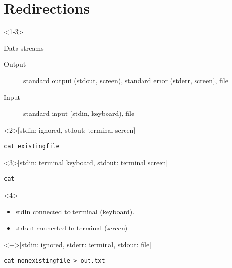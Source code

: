 \section{Redirections}

\begin{frame}[fragile]
  \begin{onlyenv}<1-3>
    \begin{block}{Data streams}
      \begin{description}
        \item[Output]
          standard output (stdout, screen),
          standard error (stderr, screen),
          file
        \item[Input]
          standard input (stdin, keyboard),
          file
      \end{description}
    \end{block}
  \end{onlyenv}

  \begin{example}<2>[stdin: ignored, stdout: terminal screen]
    \begin{lstlisting}
cat existingfile
    \end{lstlisting}
  \end{example}

  \begin{example}<3>[stdin: terminal keyboard, stdout: terminal screen]
    \begin{lstlisting}
cat
    \end{lstlisting}
  \end{example}

  \begin{onlyenv}<4>
    \begin{remark}[By default]
      \begin{itemize}
        \item stdin connected to terminal (keyboard).
        \item stdout connected to terminal (screen).
      \end{itemize}
    \end{remark}
  \end{onlyenv}
\end{frame}

\begin{frame}[fragile]
  \begin{example}<+>[stdin: ignored, stderr: terminal, stdout: file]
    \begin{lstlisting}
cat nonexistingfile > out.txt
    \end{lstlisting}
  \end{example}
\end{frame}


